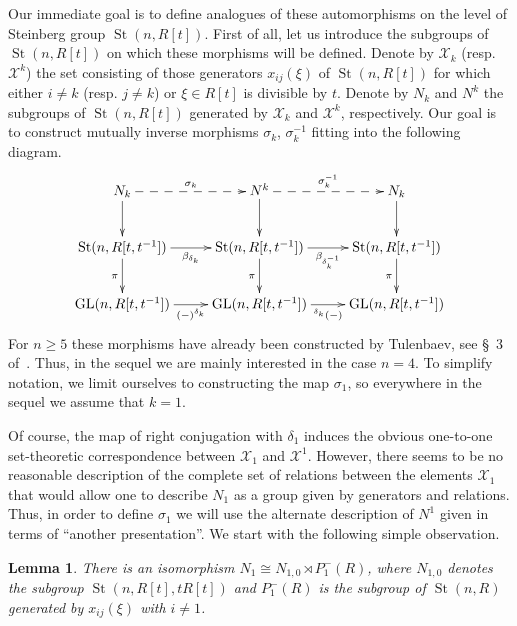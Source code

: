 \documentclass[oneside, 10pt]{amsart}
\DeclareMathOperator{\St}{St}
\DeclareMathOperator{\GL}{GL}
\numberwithin{equation}{section}
\newtheorem{lemma}{Lemma}
\numberwithin{lemma}{section}
\theoremstyle{definition}
\theoremstyle{remark}
\begin{document}
Our immediate goal is to define analogues of these automorphisms on the level of Steinberg group $\St(n, R[t])$.
First of all, let us introduce the subgroups of $\St(n, R[t])$ on which these morphisms will be defined.
Denote by $\mathcal{X}_k$ (resp. $\mathcal{X}^k$) the set consisting of those generators $x_{ij}(\xi)$ of $\St(n, R[t])$ for which 
 either $i\neq k$ (resp. $j\neq k$) or $\xi\in R[t]$ is divisible by $t$.
Denote by $N_k$ and $N^k$ the subgroups of $\St(n, R[t])$ generated by $\mathcal{X}_k$ and $\mathcal{X}^k$, respectively.
Our goal is to construct mutually inverse morphisms $\sigma_k$, $\sigma_k^{-1}$ fitting into the following diagram.
\begin{equation} \label{eq:sigma-diagram}
\xymatrix{ N_k\ar@{-->}[r]^{\sigma_k}\ar@<-0.0ex>[d] & N^k \ar@<-0.0ex>[d] \ar@{-->}[r]^{\sigma_k^{-1}} & N_k \ar[d] \\ 
          \St(n, R[t, t^{-1}]) \ar@<-0.0ex>[r]_{\beta_{\delta_k}} \ar[d]_{\pi} & \St(n, R[t, t^{-1}]) \ar@<-0.0ex>[r]_{\beta_{\delta_k^{-1}}} \ar[d]_{\pi} & \St(n, R[t, t^{-1}]) \ar[d]_{\pi} \\
          \GL(n, R[t, t^{-1}]) \ar@<-0.0ex>[r]_{(-)^{\delta_k}} & \GL(n, R[t, t^{-1}]) \ar@<-0.0ex>[r]_{{}^{\delta_k}(-)} & \GL(n, R[t, t^{-1}])}
\end{equation}
For $n\geq 5$ these morphisms have already been constructed by Tulenbaev, see \S~3 of~\cite{Tu83}.
Thus, in the sequel we are mainly interested in the case $n=4$.
To simplify notation, we limit ourselves to constructing the map $\sigma_1$, so everywhere in the sequel we assume that $k=1$. 

Of course, the map of right conjugation with $\delta_1$ induces the obvious one-to-one set-theoretic correspondence between $\mathcal{X}_1$ and $\mathcal{X}^1$. 
However, there seems to be no reasonable description of the complete set of relations between the elements $\mathcal{X}_1$ that would allow one to describe $N_1$
 as a group given by generators and relations.
Thus, in order to define $\sigma_1$ we will use the alternate description of $N^1$ given in terms of ``another presentation''.
We start with the following simple observation.
\begin{lemma} \label{lem:n1-decomp} There is an isomorphism $N_1 \cong N_{1,0} \rtimes P_1^-(R)$, where $N_{1,0}$ denotes the subgroup $\St(n, R[t], tR[t])$
 and $P_1^-(R)$ is the subgroup of $\St(n, R)$ generated by $x_{ij}(\xi)$ with $i\neq 1$.
\end{lemma}
\end{document}
